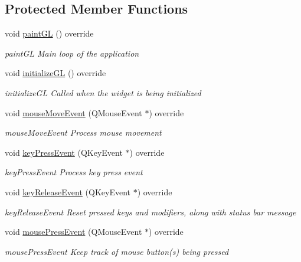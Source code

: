 \subsection*{Protected Member Functions}
\begin{DoxyCompactItemize}
\item 
void \hyperlink{class_home_designer_open_g_l_widget_a4222406ea010bada5b614f4aa9a408e3}{paint\+G\+L} () override
\begin{DoxyCompactList}\small\item\em paint\+G\+L Main loop of the application \end{DoxyCompactList}\item 
void \hyperlink{class_home_designer_open_g_l_widget_ab4d259ef3a1e4d80cc784f04d1e0da1f}{initialize\+G\+L} () override
\begin{DoxyCompactList}\small\item\em initialize\+G\+L Called when the widget is being initialized \end{DoxyCompactList}\item 
void \hyperlink{class_home_designer_open_g_l_widget_a9374ffef11f1f4be2eb7070e2a13ee65}{mouse\+Move\+Event} (Q\+Mouse\+Event $\ast$) override
\begin{DoxyCompactList}\small\item\em mouse\+Move\+Event Process mouse movement \end{DoxyCompactList}\item 
void \hyperlink{class_home_designer_open_g_l_widget_a44f26dde734bb6b1b4e30c4c2b2a6d9a}{key\+Press\+Event} (Q\+Key\+Event $\ast$) override
\begin{DoxyCompactList}\small\item\em key\+Press\+Event Process key press event \end{DoxyCompactList}\item 
void \hyperlink{class_home_designer_open_g_l_widget_aca029316bc95418bb9c6f8c372a74b0d}{key\+Release\+Event} (Q\+Key\+Event $\ast$) override
\begin{DoxyCompactList}\small\item\em key\+Release\+Event Reset pressed keys and modifiers, along with status bar message \end{DoxyCompactList}\item 
void \hyperlink{class_home_designer_open_g_l_widget_a89d62b03f15537ab73b7cd7af1346967}{mouse\+Press\+Event} (Q\+Mouse\+Event $\ast$) override
\begin{DoxyCompactList}\small\item\em mouse\+Press\+Event Keep track of mouse button(s) being pressed \end{DoxyCompactList}\item 

\end{DoxyCompactItemize}
